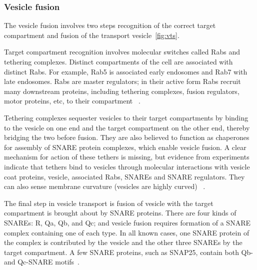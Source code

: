 \subsubsection{Vesicle fusion} The vesicle fusion involves two steps recognition of the correct target compartment and fusion of the transport vesicle~\ref{fig:vts}.

Target compartment recognition involves molecular switches called Rabs and  tethering complexes. Distinct compartments of the cell are associated with distinct Rabs. For example, Rab5 is associated early endosomes and  Rab7 with late endosomes\cite{rink2005rab}.  
%
Rabs are master regulators; in their active form Rabs recruit many downstream proteins, including tethering complexes, fusion regulators, motor proteins, etc, to their compartment ~\cite{muller2018molecular}.

Tethering complexes sequester vesicles to their target compartments by binding to the vesicle on one end and the target compartment on the other end, thereby bridging the two before fusion. 
%
They are also believed to function as chaperones for assembly of SNARE protein complexes, which enable vesicle fusion. 
%
A clear mechanism for action of these tethers is missing, but evidence from experiments indicate that tethers bind to vesicles through molecular interactions with vesicle coat proteins, vesicle, associated Rabs, SNAREs and SNARE regulators. 
%
They can also sense membrane curvature (vesicles are highly curved) ~\cite{baker2016chaperoning}.

The final step in vesicle transport is fusion of vesicle with the target compartment is brought about by SNARE proteins. 
%
There are four kinds of SNAREs: R, Qa, Qb, and Qc; and vesicle fusion requires formation of a SNARE complex containing one of each type. 
%
In all known cases, one SNARE protein of the complex is contributed by the vesicle and the other three SNAREs by the target compartment. 
%
A few SNARE proteins, such as SNAP25, contain both Qb- and Qc-SNARE motifs~\cite{yoon2018snare}.

